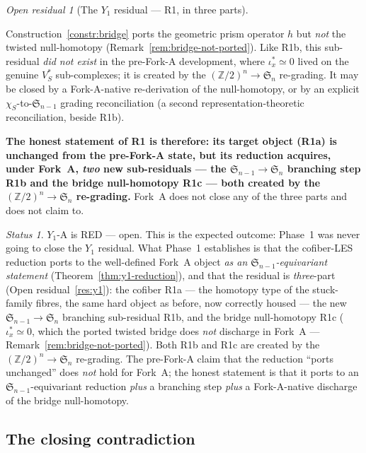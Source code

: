\documentclass[11pt,oneside]{amsart}
\theoremstyle{plain}
\theoremstyle{definition}
\theoremstyle{remark}
\theoremstyle{honeststyle}
\newtheorem{status}[theorem]{Status}
\newtheorem{openresidual}[theorem]{Open residual}
\newcommand{\Sym}{\mathfrak{S}}
\newcommand{\Z}{\mathbb{Z}}
\newcommand{\walsh}[1]{\chi_{#1}}
\begin{document}
\begin{openresidual}[The $Y_1$ residual --- R1, in three parts]
\begin{itemize}[leftmargin=1.7em]
  Construction~\ref{constr:bridge} ports the geometric prism operator
  $h$ but \emph{not} the twisted null-homotopy
  (Remark~\ref{rem:bridge-not-ported}). Like R1b, this sub-residual
  \emph{did not exist} in the pre-Fork-A development, where
  $\iota_x^{*}\simeq0$ lived on the genuine $V_S^{*}$ sub-complexes;
  it is created by the $(\Z/2)^n\to\Sym_n$ re-grading. It may be
  closed by a Fork-A-native re-derivation of the null-homotopy, or by
  an explicit $\walsh{S}$-to-$\Sym_{n-1}$ grading reconciliation (a
  second representation-theoretic reconciliation, beside R1b).
\end{itemize}
\textbf{The honest statement of R1 is therefore: its target object
(R1a) is unchanged from the pre-Fork-A state, but its reduction
acquires, under Fork~A, \emph{two} new sub-residuals --- the
$\Sym_{n-1}\to\Sym_n$ branching step R1b and the bridge
null-homotopy R1c --- both created by the $(\Z/2)^n\to\Sym_n$
re-grading.} Fork~A does not close any of the three parts and does
not claim to.
\end{openresidual}

\begin{status}
\label{status:y1a}
$Y_1$-A is \textsf{RED --- open}. This is the expected outcome:
Phase~1 was never going to close the $Y_1$ residual. What Phase~1
establishes is that the cofiber-LES reduction ports to the
well-defined Fork~A object \emph{as an $\Sym_{n-1}$-equivariant
statement} (Theorem~\ref{thm:y1-reduction}), and that the residual is
\emph{three}-part (Open residual~\ref{res:y1}): the cofiber R1a ---
the homotopy type of the stuck-family fibres, the same hard object as
before, now correctly housed --- the new $\Sym_{n-1}\to\Sym_n$
branching sub-residual R1b, and the bridge null-homotopy R1c
($\iota_x^{*}\simeq0$, which the ported twisted bridge does
\emph{not} discharge in Fork~A --- Remark~\ref{rem:bridge-not-ported}).
Both R1b and R1c are created by the $(\Z/2)^n\to\Sym_n$ re-grading.
The pre-Fork-A claim that the reduction ``ports unchanged'' does
\emph{not} hold for Fork~A; the honest statement is that it ports to
an $\Sym_{n-1}$-equivariant reduction \emph{plus} a branching step
\emph{plus} a Fork-A-native discharge of the bridge null-homotopy.
\end{status}

\subsection{The closing contradiction}
\label{ssec:closing}
\end{document}
